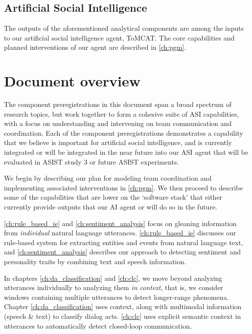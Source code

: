 \subsection{Artificial Social Intelligence}

The outputs of the aforementioned analytical components are among the inputs to
our artificial social intelligence agent, ToMCAT. The core capabilities and
planned interventions of our agent are described in \autoref{ch:pgm}.

\section{Document overview}


The component preregistrations in this document span a broad spectrum of
research topics, but work together to form a cohesive suite of ASI
capabilities, with a focus on understanding and intervening on team
communication and coordination.
Each of the component preregistrations demonstrates a capability that we
believe is important for artificial social intelligence, and is currently
integrated or will be integrated in the near future into our ASI agent that
will be evaluated in ASIST study 3 or future ASIST experiments.

We begin by describing our plan for modeling team coordination and implementing
associated interventions in \autoref{ch:pgm}.  We then proceed to describe some
of the capabilities that are lower on the `software stack' that either
currently provide outputs that our AI agent or will do so in the future.

\autoref{ch:rule_based_ie} and \autoref{ch:sentiment_analysis} focus on
gleaning information from \emph{individual} natural language utterances.
\autoref{ch:rule_based_ie} discusses our rule-based system for extracting
entities and events from natural language text, and
\autoref{ch:sentiment_analysis} describes our approach to detecting sentiment
and personality traits by combining text and speech information.

In chapters \autoref{ch:da_classification} and \autoref{ch:clc}, we move beyond
analyzing utterances individually to analyzing them \emph{in context}, that is,
we consider windows containing multiple utterances to detect longer-range
phenomena. Chapter \autoref{ch:da_classification} uses context, along with
multimodal information (speech \& text) to classify dialog acts.
\autoref{ch:clc} uses explicit semantic context in utterances to automatically
detect closed-loop communication.

